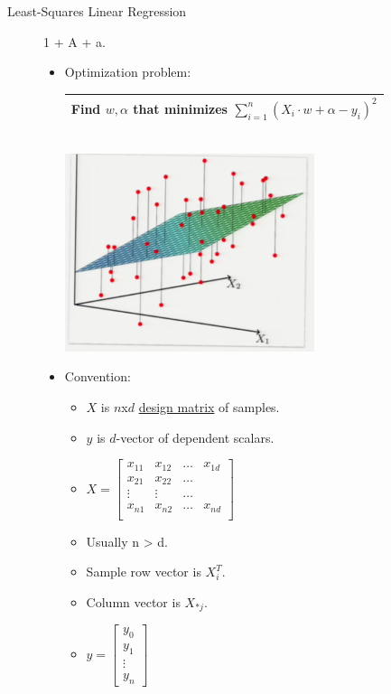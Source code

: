 \documentclass[10pt]{article}
\begin{document}
\begin{description}
	\item[Least-Squares Linear Regression] 1 + A + a.
	\begin{itemize}
		\item Optimization problem:
			\begin{center}
				\begin{tabular}{|c|}
					\hline
					Find $w, \alpha$ that minimizes
					$\sum_{i=1}^{n} (X_{i}\cdot w + \alpha - y_{i})^{2}$\\
					\hline
				\end{tabular}\\
				[1em]
				\includegraphics[scale=0.5]{images/leastsquares}
			\end{center}
		\item Convention:
			\begin{itemize}
				\item $X$ is $n$x$d$ \underline{design matrix} of samples.
				\item $y$ is $d$-vector of dependent scalars.
				\item $X = \begin{bmatrix}
					x_{11} & x_{12} & \dots & x_{1d}\\
					x_{21} & x_{22} & \dots & \\
					\vdots & \vdots & \hdots & \\
					x_{n1} & x_{n2} & \dots & x_{nd}\\
				\end{bmatrix}$
				\item Usually n > d.
				\item Sample row vector is $X_{i}^{T}$.
				\item Column vector is $X_{*j}$.
				\item $y = \begin{bmatrix}
						y_{0}\\
						y_{1}\\
						\vdots\\
						y_{n}
				\end{bmatrix}$

\end{itemize}
\end{itemize}
\end{description}
\end{document}
